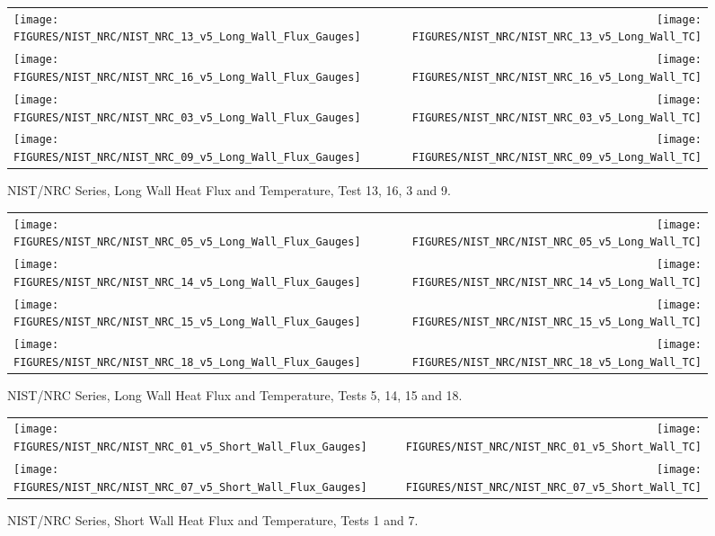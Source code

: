 \begin{figure}[p]
\begin{tabular*}{\textwidth}{l@{\extracolsep{\fill}}r}
\texttt{[image: FIGURES/NIST\_NRC/NIST\_NRC\_13\_v5\_Long\_Wall\_Flux\_Gauges]} &
\texttt{[image: FIGURES/NIST\_NRC/NIST\_NRC\_13\_v5\_Long\_Wall\_TC]} \\
\texttt{[image: FIGURES/NIST\_NRC/NIST\_NRC\_16\_v5\_Long\_Wall\_Flux\_Gauges]} &
\texttt{[image: FIGURES/NIST\_NRC/NIST\_NRC\_16\_v5\_Long\_Wall\_TC]} \\
\texttt{[image: FIGURES/NIST\_NRC/NIST\_NRC\_03\_v5\_Long\_Wall\_Flux\_Gauges]} &
\texttt{[image: FIGURES/NIST\_NRC/NIST\_NRC\_03\_v5\_Long\_Wall\_TC]} \\
\texttt{[image: FIGURES/NIST\_NRC/NIST\_NRC\_09\_v5\_Long\_Wall\_Flux\_Gauges]} &
\texttt{[image: FIGURES/NIST\_NRC/NIST\_NRC\_09\_v5\_Long\_Wall\_TC]}

\end{tabular*}
\caption{NIST/NRC Series, Long Wall Heat Flux and Temperature, Test 13, 16, 3 and 9.}
\label{NIST_NRC_Long_3}
\end{figure}

\begin{figure}[p]
\begin{tabular*}{\textwidth}{l@{\extracolsep{\fill}}r}
\texttt{[image: FIGURES/NIST\_NRC/NIST\_NRC\_05\_v5\_Long\_Wall\_Flux\_Gauges]} &
\texttt{[image: FIGURES/NIST\_NRC/NIST\_NRC\_05\_v5\_Long\_Wall\_TC]} \\
\texttt{[image: FIGURES/NIST\_NRC/NIST\_NRC\_14\_v5\_Long\_Wall\_Flux\_Gauges]} &
\texttt{[image: FIGURES/NIST\_NRC/NIST\_NRC\_14\_v5\_Long\_Wall\_TC]} \\
\texttt{[image: FIGURES/NIST\_NRC/NIST\_NRC\_15\_v5\_Long\_Wall\_Flux\_Gauges]} &
\texttt{[image: FIGURES/NIST\_NRC/NIST\_NRC\_15\_v5\_Long\_Wall\_TC]} \\
\texttt{[image: FIGURES/NIST\_NRC/NIST\_NRC\_18\_v5\_Long\_Wall\_Flux\_Gauges]} &
\texttt{[image: FIGURES/NIST\_NRC/NIST\_NRC\_18\_v5\_Long\_Wall\_TC]}
\end{tabular*}
\caption{NIST/NRC Series, Long Wall Heat Flux and Temperature, Tests 5, 14, 15 and 18.}
\label{NIST_NRC_Long_4}
\end{figure}

\clearpage

\begin{figure}[h!]
\begin{tabular*}{\textwidth}{l@{\extracolsep{\fill}}r}
\texttt{[image: FIGURES/NIST\_NRC/NIST\_NRC\_01\_v5\_Short\_Wall\_Flux\_Gauges]} &
\texttt{[image: FIGURES/NIST\_NRC/NIST\_NRC\_01\_v5\_Short\_Wall\_TC]} \\
\texttt{[image: FIGURES/NIST\_NRC/NIST\_NRC\_07\_v5\_Short\_Wall\_Flux\_Gauges]} &
\texttt{[image: FIGURES/NIST\_NRC/NIST\_NRC\_07\_v5\_Short\_Wall\_TC]}

\end{tabular*}
\caption{NIST/NRC Series, Short Wall Heat Flux and Temperature, Tests 1 and 7.}
\label{NIST_NRC_Short_1}
\end{figure}

